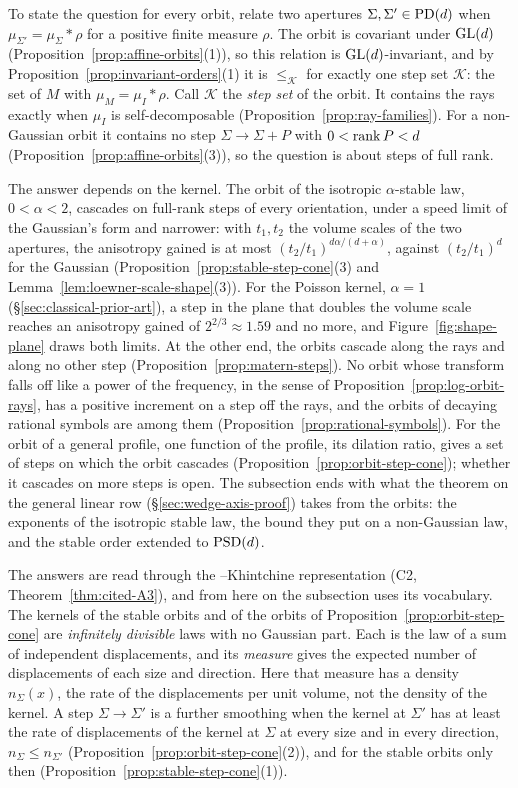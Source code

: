 To state the question for every orbit, relate two apertures $\Sigma, \Sigma' \in \mathrm{PD}(d)$
when $\mu_{\Sigma'} = \mu_\Sigma * \rho$ for a positive finite measure $\rho$. The orbit is covariant
under $\mathrm{GL}(d)$ (Proposition~\ref{prop:affine-orbits}(1)), so this relation is $\mathrm{GL}(d)$-invariant, and by
Proposition~\ref{prop:invariant-orders}(1) it is $\le_{\mathcal K}$ for exactly one step set
$\mathcal K$: the set of $M$ with $\mu_M = \mu_I * \rho$. Call $\mathcal K$ the \emph{step set} of the
orbit. It contains the rays exactly when $\mu_I$ is self-decomposable
(Proposition~\ref{prop:ray-families}). For a non-Gaussian orbit it contains no step
$\Sigma \to \Sigma + P$ with $0 < \operatorname{rank} P < d$ (Proposition~\ref{prop:affine-orbits}(3)), so the
question is about steps of full rank.

The answer depends on the kernel. The orbit of the isotropic $\alpha$-stable law, $0 < \alpha < 2$,
cascades on full-rank steps of every orientation, under a speed limit of the Gaussian's form and
narrower: with $t_1, t_2$ the volume scales of the two apertures, the anisotropy gained is at most
$(t_2/t_1)^{d\alpha/(d+\alpha)}$, against $(t_2/t_1)^d$ for the Gaussian
(Proposition~\ref{prop:stable-step-cone}(3) and Lemma~\ref{lem:loewner-scale-shape}(3)). For the
Poisson kernel, $\alpha = 1$ (\S\ref{sec:classical-prior-art}), a step in the plane that doubles the
volume scale reaches an anisotropy gained of $2^{2/3} \approx 1.59$ and no more, and
Figure~\ref{fig:shape-plane} draws both limits. At the other end, the \Matern{} orbits cascade along
the rays and along no other step (Proposition~\ref{prop:matern-steps}). No orbit whose transform falls
off like a power of the frequency, in the sense of Proposition~\ref{prop:log-orbit-rays}, has a
positive increment on a step off the rays, and the orbits of decaying rational symbols are among them
(Proposition~\ref{prop:rational-symbols}). For the orbit of a general profile, one function of the
profile, its dilation ratio, gives a set of steps on which the orbit cascades
(Proposition~\ref{prop:orbit-step-cone}); whether it cascades on more steps is open. The subsection
ends with what the theorem on the general linear row (\S\ref{sec:wedge-axis-proof}) takes from the
orbits: the exponents of the isotropic stable law, the bound they put on a non-Gaussian law, and the
stable order extended to $\mathrm{PSD}(d)$.

The answers are read through the \Levy--Khintchine representation (C2, Theorem~\ref{thm:cited-A3}),
and from here on the subsection uses its vocabulary. The kernels of the stable orbits and of the
orbits of Proposition~\ref{prop:orbit-step-cone} are \emph{infinitely divisible} laws with no
Gaussian part. Each is the law of a sum of independent displacements, and its \emph{\Levy{} measure}
gives the expected number of displacements of each size and direction. Here that measure has a
density $n_\Sigma(x)$, the rate of the displacements per unit volume, not the density of the kernel.
A step $\Sigma \to \Sigma'$ is a further smoothing when the kernel at $\Sigma'$ has at least the rate
of displacements of the kernel at $\Sigma$ at every size and in every direction,
$n_\Sigma \le n_{\Sigma'}$ (Proposition~\ref{prop:orbit-step-cone}(2)), and for the stable orbits only
then (Proposition~\ref{prop:stable-step-cone}(1)).


